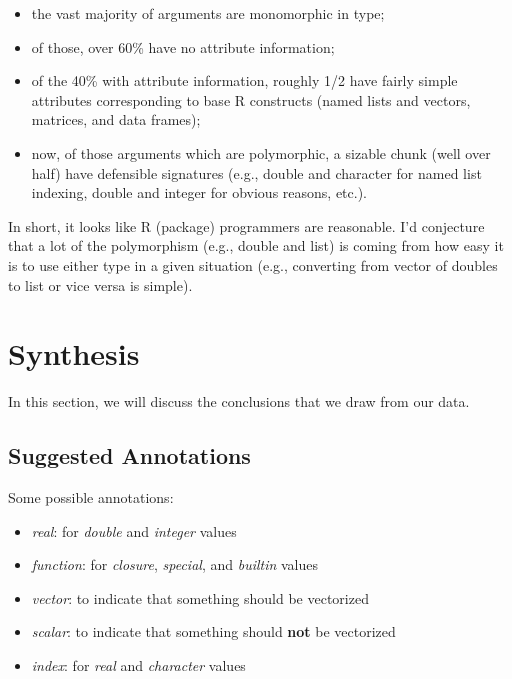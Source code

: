 \documentclass[acmsmall,10pt,review,anonymous]{acmart}\settopmatter{printfolios=true,printccs=false,printacmref=false}
\begin{document}
\begin{itemize}
    \item the vast majority of arguments are monomorphic in type;
    \item of those, over 60\% have no attribute information;
    \item of the 40\% with attribute information, roughly 1/2 have fairly
      simple attributes corresponding to base R constructs (named lists and
      vectors, matrices, and data frames);
    \item now, of those arguments which are polymorphic, a sizable chunk (well over half) have defensible signatures (e.g., double and character for named list indexing, double and integer for obvious reasons, etc.).
\end{itemize}

In short, it looks like R (package) programmers are reasonable.  I'd
conjecture that a lot of the polymorphism (e.g., double and list) is coming
from how easy it is to use either type in a given situation (e.g.,
converting from vector of doubles to list or vice versa is simple).

%
%
%
%
%
%
\section{Synthesis}

In this section, we will discuss the conclusions that we draw from our data.


%
%
\subsection{Suggested Annotations}


Some possible annotations:

\begin{itemize}
    \item \textit{real}: for \textit{double} and \textit{integer} values
    \item \textit{function}: for \textit{closure}, \textit{special}, and \textit{builtin} values
    \item \textit{vector}: to indicate that something should be vectorized
    \item \textit{scalar}: to indicate that something should \textbf{not} be vectorized
    \item \textit{index}: for \textit{real} and \textit{character} values
\end{itemize}
\end{document}
